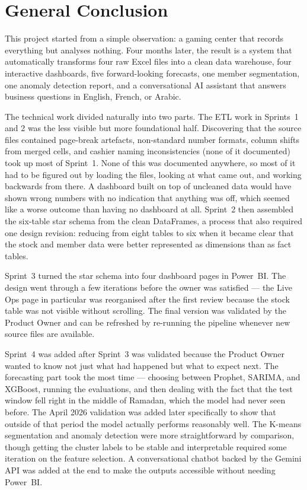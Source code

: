 \documentclass[12pt, a4paper]{report}
\begin{document}
\chapter*{General Conclusion}

This project started from a simple observation: a gaming center that records
everything but analyses nothing. Four months later, the result is a system that
automatically transforms four raw Excel files into a clean data warehouse, four
interactive dashboards, five forward-looking forecasts, one member segmentation,
one anomaly detection report, and a conversational AI assistant that answers
business questions in English, French, or Arabic.

The technical work divided naturally into two parts. The ETL work in Sprints~1 and 2
was the less visible but more foundational half. Discovering that the source files
contained page-break artefacts, non-standard number formats, column shifts from
merged cells, and cashier naming inconsistencies (none of it documented) took up
most of Sprint~1. None of this was documented anywhere, so most of it had to be
figured out by loading the files, looking at what came out, and working backwards
from there. A dashboard built on top of uncleaned data would have shown wrong
numbers with no indication that anything was off, which seemed like a worse
outcome than having no dashboard at all.
Sprint~2 then assembled the six-table star schema from the clean DataFrames, a
process that also required one design revision: reducing from eight tables to six
when it became clear that the stock and member data were better represented as
dimensions than as fact tables.

Sprint~3 turned the star schema into four dashboard pages in Power~BI. The
design went through a few iterations before the owner was satisfied --- the
Live Ops page in particular was reorganised after the first review because
the stock table was not visible without scrolling. The final version was
validated by the Product Owner and can be refreshed by re-running the pipeline
whenever new source files are available.

Sprint~4 was added after Sprint~3 was validated because the Product Owner wanted
to know not just what had happened but what to expect next. The forecasting part
took the most time --- choosing between Prophet, SARIMA, and XGBoost, running the
evaluations, and then dealing with the fact that the test window fell right in the
middle of Ramadan, which the model had never seen before. The April 2026 validation
was added later specifically to show that outside of that period the model actually
performs reasonably well. The K-means segmentation and anomaly detection were more
straightforward by comparison, though getting the cluster labels to be stable and
interpretable required some iteration on the feature selection. A conversational
chatbot backed by the Gemini API was added at the end to make the outputs accessible
without needing Power~BI.
\end{document}
